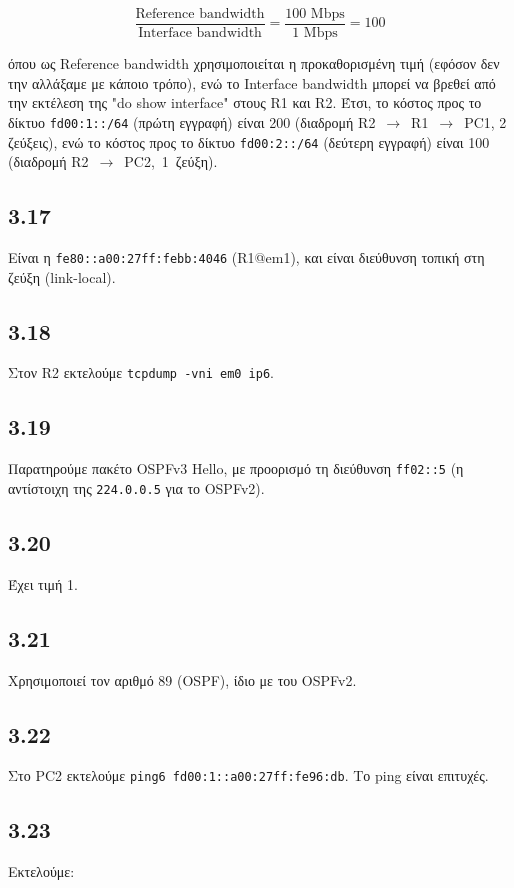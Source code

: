 \documentclass[a4paper, 12pt]{article}
\begin{document}
		\[
			\dfrac{\text{Reference bandwidth}}{\text{Interface bandwidth}} = \dfrac{100 \text{ Mbps}}{1 \text{ Mbps}} = 100
		\]
		
		όπου ως Reference bandwidth χρησιμοποιείται η προκαθορισμένη τιμή (εφόσον δεν την αλλάξαμε με κάποιο τρόπο), ενώ το Interface bandwidth μπορεί να βρεθεί από την εκτέλεση της "do show interface" στους R1 και R2. Έτσι, το κόστος προς το δίκτυο \verb|fd00:1::/64| (πρώτη εγγραφή) είναι 200 (διαδρομή \mbox{R2 $\rightarrow$ R1 $\rightarrow$ PC1}, 2 ζεύξεις), ενώ το κόστος προς το δίκτυο \verb|fd00:2::/64| (δεύτερη εγγραφή) είναι 100 (διαδρομή \mbox{R2 $\rightarrow$ PC2, 1 ζεύξη)}.

	\subsection*{3.17}
		Είναι η \verb|fe80::a00:27ff:febb:4046| (R1@em1), και είναι διεύθυνση τοπική στη ζεύξη (link-local).

	\subsection*{3.18}
		Στον R2 εκτελούμε \verb|tcpdump -vni em0 ip6|.

	\subsection*{3.19}
		Παρατηρούμε πακέτο OSPFv3 Hello, με προορισμό τη διεύθυνση \verb|ff02::5| (η αντίστοιχη της \verb|224.0.0.5| για το OSPFv2).

	\subsection*{3.20}
		Έχει τιμή 1.

	\subsection*{3.21}
		Χρησιμοποιεί τον αριθμό 89 (OSPF), ίδιο με του OSPFv2.

	\subsection*{3.22}
		Στο PC2 εκτελούμε \verb|ping6 fd00:1::a00:27ff:fe96:db|. Το ping είναι επιτυχές.

	\subsection*{3.23}
		Εκτελούμε:
		
\end{document}
